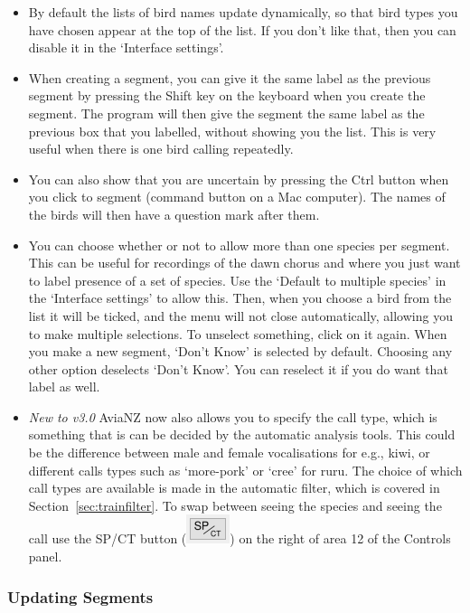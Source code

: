 \documentclass{article}
\begin{document}
\begin{itemize}
\item By default the lists of bird names update dynamically, so that bird types you have chosen appear at the top of the list. If you don't like that, then you can disable it in the `Interface settings'. 

\item When creating a segment, you can give it the same label as the previous segment by pressing the Shift key on the keyboard when you create the segment. The program will then give the segment the same label as the previous box that you labelled, without showing you the list. This is very useful when there is one bird calling repeatedly.

\item You can also show that you are uncertain by pressing the Ctrl button when you click to segment (command button on a Mac computer). The names of the birds will then have a question mark after them.

\item You can choose whether or not to allow more than one species per segment. This can be useful for recordings of the dawn chorus and where you just want to label presence of a set of species. Use the `Default to multiple species' in the `Interface settings' to allow this. Then, when you choose a bird from the list it will be ticked, and the menu will not close automatically, allowing you to make multiple selections. To unselect something, click on it again. When you make a new segment, `Don't Know' is selected by default. Choosing any other option deselects `Don't Know'. You can reselect it if you do want that label as well. 

\item {\em New to v3.0} AviaNZ now also allows you to specify the call type, which is something that is can be decided by the automatic analysis tools. This could be the difference between male and female vocalisations for e.g., kiwi, or different calls types such as `more-pork' or `cree' for ruru. The choice of which call types are available is made in the automatic filter, which is covered in Section~\ref{sec:trainfilter}. To swap between seeing the species and seeing the call use the SP/CT button (\includegraphics[scale=0.5]{Figures/SPCT}) on the right of area 12 of the Controls panel.
\end{itemize}

\subsubsection*{Updating Segments}
\end{document}
